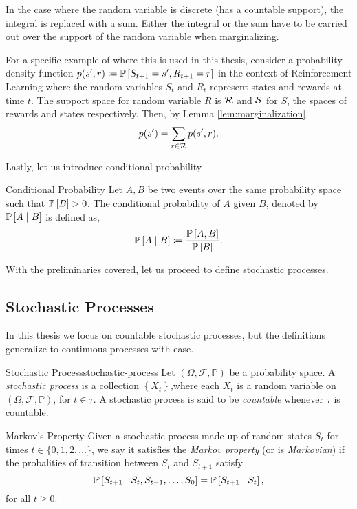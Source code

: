 In the case where the random variable is discrete (has a countable support), the
integral is replaced with a sum. Either the integral or the sum have to be
carried out over the support of the random variable when marginalizing.

For a specific example of where this is used in this thesis, consider a
probability density function $p(s', r) \coloneqq \mathbb{P}\left[S_{t+1} = s', R_{t+1} = r\right]$
in the context of Reinforcement Learning where the random variables $S_t$ and
$R_t$ represent states and rewards at time $t$. The support space for random
variable $R$ is $\mathcal{R}$ and $\mathcal{S}$ for $S$, the spaces of rewards and
states respectively. Then, by Lemma
\ref{lem:marginalization},
\[
    p(s') = \sum_{r \in \mathcal{R}} p(s', r).
\] 

Lastly, let us introduce conditional probability

\begin{dfn}{Conditional Probability}{}
    Let $A, B$ be two events over the same probability space such that $\mathbb{P}\left[B\right] >
    0$. The conditional probability of $A$ given $B$, denoted by $\mathbb{P}\left[A \mid B\right]$
    is defined as,
    \begin{equation}
        \mathbb{P}\left[A \mid B\right] \coloneqq \frac{\mathbb{P}\left[A, B\right]}{\mathbb{P}\left[B\right]}.
    \end{equation}
\end{dfn}

With the preliminaries covered, let us proceed to define stochastic processes.

\subsection{Stochastic Processes}

In this thesis we focus on countable stochastic processes, but the definitions
generalize to continuous processes with ease.

\begin{dfn}{Stochastic Process}{stochastic-process}
    Let $(\Omega, \mathcal{F}, \mathbb{P})$ be a probability space. A
    \emph{stochastic process} is a collection $\left\{ X_t \right\}$,where each
    $X_t$ is a random variable on $(\Omega, \mathcal{F}, \mathbb{P})$, for $t
    \in \tau$. A stochastic process is said to be \emph{countable} whenever
    $\tau$ is countable.
\end{dfn}

\begin{dfn}{Markov's Property}{}
    Given a stochastic process made up of random states $S_t$ for times $t \in
    \{0, 1, 2, \dots\}$, we say it satisfies the \emph{Markov property} (or is
    \emph{Markovian}) if the probalities of transition between $S_t$ and
    $S_{t+1}$ satisfy
    \[
        \mathbb{P}\left[S_{t+1} \mid S_t, S_{t-1}, \dots, S_0 \right] = \mathbb{P}\left[S_{t+1} \mid S_t\right],
    \]
    for all $t \geq 0$.
\end{dfn}

